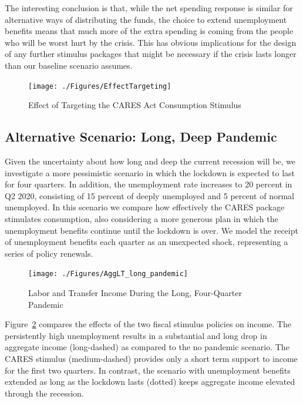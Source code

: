\documentclass[titlepage,a4paper]{\econtex}
\begin{document}
The interesting conclusion is that, while the net spending response is similar for alternative ways of distributing the funds, the choice to extend unemployment benefits means that much more of the extra spending is coming from the people who will be worst hurt by the crisis.  This has obvious implications for the design of any further stimulus packages that might be necessary if the crisis lasts longer than our baseline scenario assumes.

\begin{figure}
  \centering
  \caption{Effect of Targeting the CARES Act Consumption Stimulus}
  \label{EffectTargeting}
  { \texttt{[image: ./Figures/EffectTargeting]}}
\end{figure}


\subsection{Alternative Scenario: Long, Deep Pandemic} \label{sec:longPandemic}

Given the uncertainty about how long and deep the current recession will be, we investigate a more pessimistic scenario in which the lockdown is expected to last for four quarters.
In addition, the unemployment rate increases to 20 percent in Q2 2020, consisting of 15 percent of deeply unemployed and 5 percent of normal unemployed.
In this scenario we compare how effectively the CARES package stimulates consumption, also considering a more generous plan in which the unemployment benefits continue until the lockdown is over.
We model the receipt of unemployment benefits each quarter as an unexpected shock, representing a series of policy renewals.

\begin{figure}
  \centering
  \caption{Labor and Transfer Income During the Long, Four-Quarter Pandemic}
  \label{inc_response_pandemic}
  { \texttt{[image: ./Figures/AggLT\_long\_pandemic]}}
\end{figure}

Figure~\ref{inc_response_pandemic} compares the effects of the two fiscal stimulus policies on income.
The persistently high unemployment results in a substantial and long drop in aggregate income (long-dashed) as compared to the no pandemic scenario.
The CARES stimulus (medium-dashed) provides only a short term support to income for the first two quarters.
In contrast, the scenario with unemployment benefits extended as long as the lockdown lasts (dotted) keeps aggregate income elevated through the recession.
\end{document}
